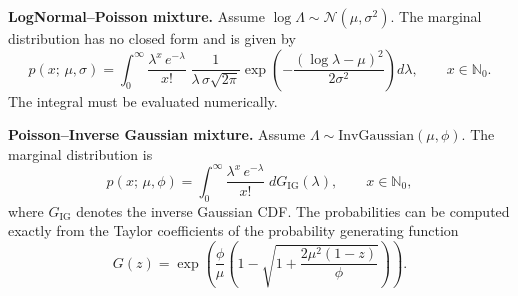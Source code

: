 \documentclass{article}
\begin{document}
\medskip

\noindent\textbf{LogNormal--Poisson mixture.}\;
Assume $\log\Lambda \sim \mathcal{N}(\mu,\sigma^2)$.
The marginal distribution has no closed form and is given by
\[
p(x;\,\mu,\sigma)
= \int_0^\infty
  \frac{\lambda^x\, e^{-\lambda}}{x!}\;
  \frac{1}{\lambda\,\sigma\sqrt{2\pi}}
  \exp\!\left(-\frac{(\log\lambda - \mu)^2}{2\sigma^2}\right)
  d\lambda,
\qquad x \in \mathbb{N}_0.
\]
The integral must be evaluated numerically.

\medskip

\noindent\textbf{Poisson--Inverse Gaussian mixture.}\;
Assume $\Lambda \sim \mathrm{InvGaussian}(\mu,\phi)$.
The marginal distribution is
\[
p(x;\,\mu,\phi)
= \int_0^\infty
  \frac{\lambda^x\, e^{-\lambda}}{x!}\;
  dG_{\mathrm{IG}}(\lambda),
\qquad x \in \mathbb{N}_0,
\]
where $G_{\mathrm{IG}}$ denotes the inverse Gaussian CDF. The
probabilities can be computed exactly from the Taylor coefficients of
the probability generating function
\[
G(z)
= \exp\!\left(
  \frac{\phi}{\mu}
  \left(1 - \sqrt{1 + \frac{2\mu^2(1-z)}{\phi}}\right)
\right).
\]



\end{document}
